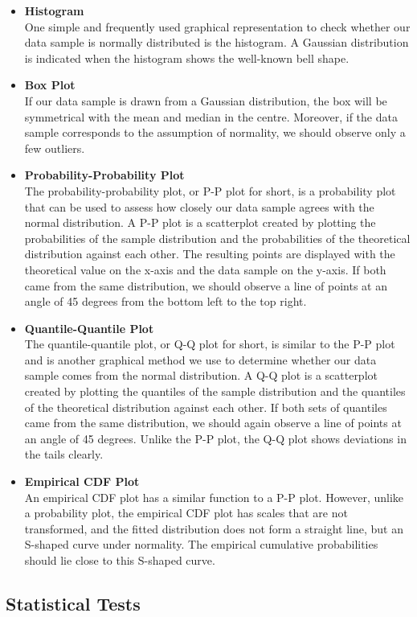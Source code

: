 \documentclass[12pt,a4paper]{article}
\newcommand{\head}[1]{\textbf{#1}\\}
\begin{document}
\begin{itemize}
\item \head{Histogram}
One simple and frequently used graphical representation to check whether our data sample is normally distributed is the histogram. A Gaussian distribution is indicated when the histogram shows the well-known bell shape.
\item \head{Box Plot}
If our data sample is drawn from a Gaussian distribution, the box will be symmetrical with the mean and median in the centre. Moreover, if the data sample corresponds to the assumption of normality, we should observe only a few outliers.
\item \head{Probability-Probability Plot}
The probability-probability plot, or P-P plot for short, is a probability plot that can be used to assess how closely our data sample agrees with the normal distribution. A P-P plot is a scatterplot created by plotting the probabilities of the sample distribution and the probabilities of the theoretical distribution against each other. The resulting points are displayed with the theoretical value on the x-axis and the data sample on the y-axis. If both came from the same distribution, we should observe a line of points at an angle of 45 degrees from the bottom left to the top right.
\item \head{Quantile-Quantile Plot}
The quantile-quantile plot, or Q-Q plot for short, is similar to the P-P plot and is another graphical method we use to determine whether our data sample comes from the normal distribution. A Q-Q plot is a scatterplot created by plotting the quantiles of the sample distribution and the quantiles of the theoretical distribution against each other. If both sets of quantiles came from the same distribution, we should again observe a line of points at an angle of 45 degrees. Unlike the P-P plot, the Q-Q plot shows deviations in the tails clearly.
\item \head{Empirical CDF Plot}
An empirical CDF plot has a similar function to a P-P plot. However, unlike a probability plot, the empirical CDF plot has scales that are not transformed, and the fitted distribution does not form a straight line, but an S-shaped curve under normality. The empirical cumulative probabilities should lie close to this S-shaped curve.
\end{itemize}

\subsection{Statistical Tests}
\end{document}
